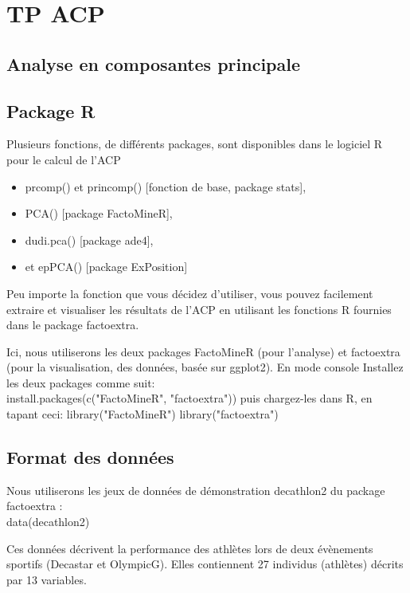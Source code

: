 \documentclass[10pt,a4paper]{report}
\author{Mory Ouattara}
\begin{document}
\chapter{TP ACP}

\section{Analyse en composantes principale }

\section{Package R}
 Plusieurs fonctions, de différents packages, sont disponibles dans le logiciel R pour le calcul de l’ACP
 
 \begin{itemize}
 \item 	prcomp() et princomp() [fonction de base, package stats],
 \item 	PCA() [package FactoMineR],
 \item 	dudi.pca() [package ade4],
 \item 	et epPCA() [package ExPosition]
 \end{itemize}
 
 
Peu importe la fonction que vous décidez d’utiliser, vous pouvez facilement extraire et visualiser les résultats de l’ACP en utilisant les fonctions R fournies dans le package factoextra.

Ici, nous utiliserons les deux packages FactoMineR (pour l’analyse) et factoextra (pour la visualisation, des données, basée sur ggplot2).
En mode console Installez les deux packages comme suit:\\
install.packages(c("FactoMineR", "factoextra")) puis  chargez-les dans R, en tapant ceci:
library("FactoMineR")
library("factoextra")

\section*{Format des données}

Nous utiliserons les jeux de données de démonstration decathlon2 du package factoextra :   \\ 

data(decathlon2)

Ces données   décrivent la performance des athlètes lors de deux évènements sportifs (Decastar et OlympicG). Elles contiennent 27 individus (athlètes) décrits par 13 variables.
\end{document}
